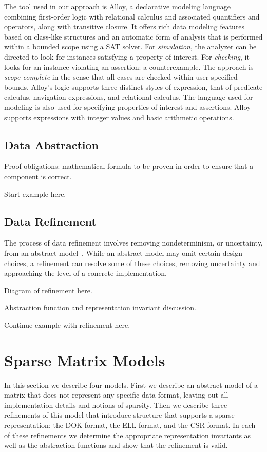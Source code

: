 \documentclass[11pt,conference]{IEEEtran}
\begin{document}
The tool used in our approach is Alloy, a declarative modeling language combining first-order logic with relational calculus and associated quantifiers and operators, along with transitive closure.  It offers rich data modeling features based on class-like structures and an automatic form of analysis that is performed within a bounded scope using a SAT solver.  For \emph{simulation}, the analyzer can be directed to look for instances satisfying a property of interest.  For \emph{checking}, it looks for an instance violating an assertion: a counterexample.  The approach is \emph{scope complete} in the sense that all cases are checked within user-specified bounds.  Alloy's logic supports three distinct styles of expression, that of predicate calculus, navigation expressions, and relational calculus.  The language used for modeling is also used for specifying properties of interest and assertions.  Alloy supports expressions with integer values and basic arithmetic operations.

\subsection{Data Abstraction}

Proof obligations: mathematical formula to be proven in order to ensure that a component is correct.

Start example here.

\subsection{Data Refinement}

The process of data refinement involves removing nondeterminism, or uncertainty, from an abstract model~\cite{woodcock1996}.  While an abstract model may omit certain design choices, a refinement can resolve some of these choices, removing uncertainty and approaching the level of a concrete implementation.

Diagram of refinement here.

Abstraction function and representation invariant discussion.

Continue example with refinement here.

\section{Sparse Matrix Models}

In this section we describe four models.  First we describe an abstract model of a matrix that does not represent any specific data format, leaving out all implementation details and notions of sparsity. Then we describe three refinements of this model that introduce structure that supports a sparse representation: the DOK format, the ELL format, and the CSR format.  In each of these refinements we determine the appropriate representation invariants as well as the abstraction functions and show that the refinement is valid.
\end{document}
